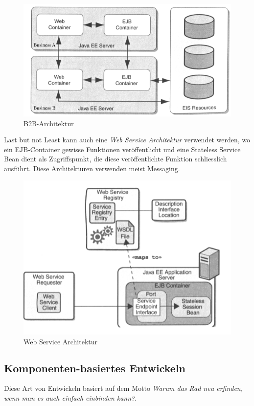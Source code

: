 \documentclass[a4paper, 11pt]{article}
\begin{document}
\begin{figure}[htb]
	\centering
	\includegraphics[keepaspectratio=true,height=15\baselineskip]{b2b.png}
	\caption{B2B-Architektur}
	\label{fig:b2b}
\end{figure}

Last but not Least kann auch eine \textit{Web Service Architektur} verwendet werden, wo ein EJB-Container gewisse Funktionen veröffentlicht und eine Stateless Service Bean dient als Zugriffspunkt, die diese veröffentlichte Funktion schliesslich ausführt. Diese Architekturen verwenden meist Messaging.

\begin{figure}[htb]
	\centering
	\includegraphics[keepaspectratio=true,height=15\baselineskip]{web-service.png}
	\caption{Web Service Architektur}
	\label{fig:webService}
\end{figure}



\subsection{Komponenten-basiertes Entwickeln}
Diese Art von Entwickeln basiert auf dem Motto \textit{Warum das Rad neu erfinden, wenn man es auch einfach einbinden kann?}. 
\end{document}

